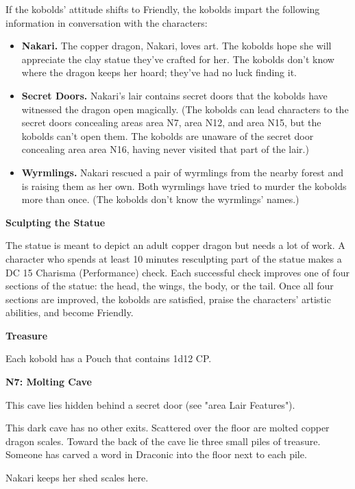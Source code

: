 \documentclass[letterpaper, 11pt, twocolumn]{dndbook}
\begin{document}
If the kobolds' attitude shifts to Friendly, the kobolds impart the following information in conversation with the characters:

\begin{itemize}
\item \textbf{Nakari.} The copper dragon, Nakari, loves art. The kobolds hope she will appreciate the clay statue they've crafted for her. The kobolds don't know where the dragon keeps her hoard; they've had no luck finding it.
\item \textbf{Secret Doors.} Nakari's lair contains secret doors that the kobolds have witnessed the dragon open magically. (The kobolds can lead characters to the secret doors concealing areas area N7, area N12, and area N15, but the kobolds can't open them. The kobolds are unaware of the secret door concealing area area N16, having never visited that part of the lair.)
\item \textbf{Wyrmlings.} Nakari rescued a pair of wyrmlings from the nearby forest and is raising them as her own. Both wyrmlings have tried to murder the kobolds more than once. (The kobolds don't know the wyrmlings' names.)
\end{itemize}

\textbf{Sculpting the Statue}

The statue is meant to depict an adult copper dragon but needs a lot of work. A character who spends at least 10 minutes resculpting part of the statue makes a DC 15 Charisma (Performance) check. Each successful check improves one of four sections of the statue: the head, the wings, the body, or the tail. Once all four sections are improved, the kobolds are satisfied, praise the characters' artistic abilities, and become Friendly.

\textbf{Treasure}

Each kobold has a Pouch that contains 1d12 CP.

\textbf{N7: Molting Cave}

This cave lies hidden behind a secret door (see "area Lair Features").

\begin{DndReadAloud}
This dark cave has no other exits. Scattered over the floor are molted copper dragon scales. Toward the back of the cave lie three small piles of treasure. Someone has carved a word in Draconic into the floor next to each pile.
\end{DndReadAloud}

Nakari keeps her shed scales here.
\end{document}
